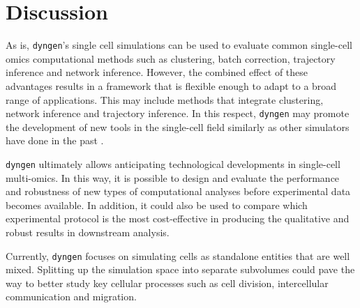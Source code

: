 \section{Discussion}
As is, \texttt{dyngen}'s single cell simulations can be used to evaluate common single-cell omics computational methods such as clustering, batch correction, trajectory inference and network inference.
However, the combined effect of these advantages results in a framework that is flexible enough to adapt to a broad range of applications. This may include methods that integrate clustering, network inference and trajectory inference. In this respect, \texttt{dyngen} may promote the development of new tools in the single-cell field similarly as other simulators have done in the past \cite{schaffter_genenetweaversilicobenchmark_2011,ewing_combiningtumorgenome_2015}.

\texttt{dyngen} ultimately allows anticipating technological developments in single-cell multi-omics. In this way, it is possible to design and evaluate the performance and robustness of new types of computational analyses before experimental data becomes available.
In addition, it could also be used to compare which experimental protocol is the most cost-effective in producing the qualitative and robust results in downstream analysis.

Currently, \texttt{dyngen} focuses on simulating cells as standalone entities that are well mixed.
Splitting up the simulation space into separate subvolumes could pave the way to better study key cellular processes such as cell division, intercellular communication and migration\cite{smith_spatialstochasticintracellular_2019}.





